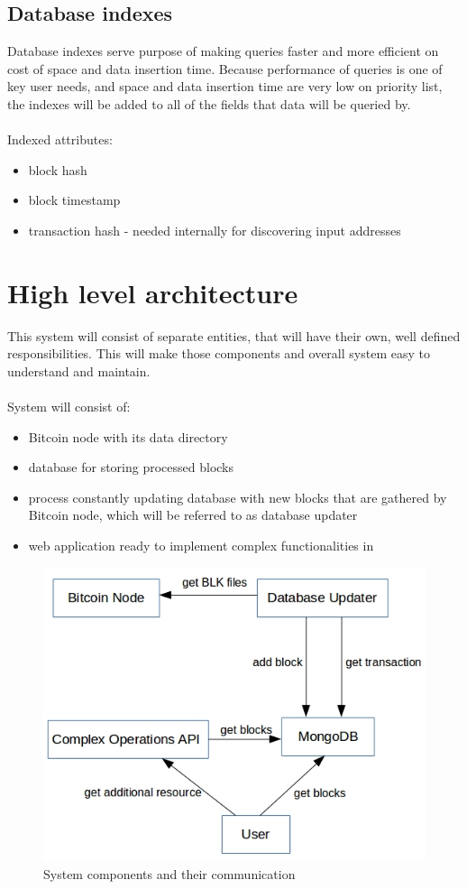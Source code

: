 \documentclass[12pt, en, eng, oneside, final]{mgr}
\begin{document}
 

\subsection{Database indexes}

Database indexes serve purpose of making queries faster and more efficient on cost of space and data insertion time.
Because performance of queries is one of key user needs, and space and data insertion time are very low on priority list, the indexes will be added to all of the fields that data will be queried by.
\\
\\
Indexed attributes:
\begin{itemize}
\item
block hash
\item
block timestamp
\item
transaction hash - needed internally for discovering input addresses
\end{itemize} 


\section{High level architecture}
This system will consist of separate entities, that will have their own, well defined responsibilities. This will make those components and overall system easy to understand and maintain.
\\
\\
System will consist of:
\begin{itemize}
\item
Bitcoin node with its data directory
\item
database for storing processed blocks
\item
process constantly updating database with new blocks that are gathered by Bitcoin node, which will be referred to as database updater
\item
web application ready to implement complex functionalities in
\end{itemize}

\begin{figure}[H]
  \includegraphics[width=0.8\linewidth]{component-diagram.png}
  \caption{System components and their communication}
  \label{fig:system-components-and-their-communication}
\end{figure}
\end{document}
